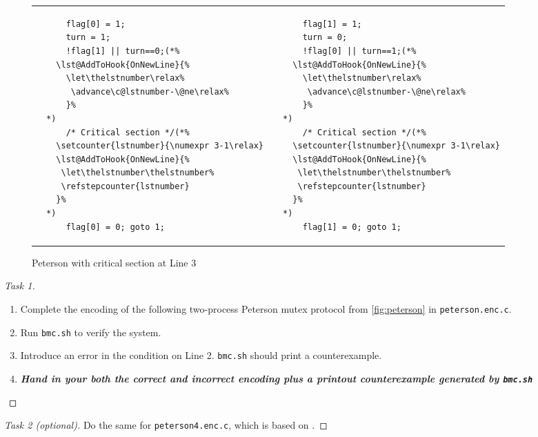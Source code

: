 \documentclass[12pt]{article}
\makeatletter
\let\origthelstnumber\thelstnumber
\newcommand*\Suppressnumber{%
  \lst@AddToHook{OnNewLine}{%
    \let\thelstnumber\relax%
     \advance\c@lstnumber-\@ne\relax%
    }%
}
\newcommand*\Reactivatenumber[1]{%
  \setcounter{lstnumber}{\numexpr#1-1\relax}
  \lst@AddToHook{OnNewLine}{%
   \let\thelstnumber\origthelstnumber%
   \refstepcounter{lstnumber}
  }%
}
\makeatother
\begin{document}
\begin{figure}
{
\lstset{
	numbers=left,
	firstnumber=0
}
\begin{tabular}{p{.1cm}p{5cm}||p{.1cm}p{3.5cm}}
&
\begin{minipage}{14em}
\begin{lstlisting}
	flag[0] = 1;
	turn = 1;
	!flag[1] || turn==0;(*\Suppressnumber*)
	/* Critical section */(*\Reactivatenumber{3}*)
	flag[0] = 0; goto 1;
\end{lstlisting}
\end{minipage}
&&
\begin{minipage}{14em}
\begin{lstlisting}
	flag[1] = 1;
	turn = 0;
	!flag[0] || turn==1;(*\Suppressnumber*)
	/* Critical section */(*\Reactivatenumber{3}*)
	flag[1] = 0; goto 1;
\end{lstlisting}
\end{minipage}\\
\end{tabular}
}
\caption{Peterson with critical section at Line $3$}
\label{fig:peterson}
\end{figure}


\begin{proof}[Task 1]
~\\
\begin{enumerate}
	\item 
Complete the encoding of the following two-process Peterson mutex protocol from \autoref{fig:peterson}
in \texttt{peterson.enc.c}.
	\item 
Run \texttt{bmc.sh} to verify the system.
	\item 
Introduce an error in the condition on Line 2. \texttt{bmc.sh} should print a counterexample.
	\item
\emph{\bf Hand in your both the correct and incorrect encoding plus a printout counterexample generated by \texttt{bmc.sh}}
\end{enumerate}


\end{proof}



\begin{proof}[Task 2 (optional)]
	Do the same for \texttt{peterson4.enc.c}, which is based on \label{fig:peterson4}.
\end{proof}
\end{document}
